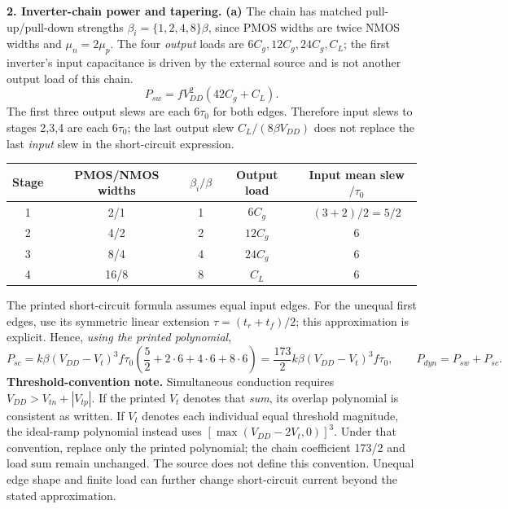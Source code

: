 \documentclass[10pt]{article}
\begin{document}
\newpage\textbf{2. Inverter-chain power and tapering.}
\textbf{(a)} The chain has matched pull-up/pull-down strengths $\beta_i=\{1,2,4,8\}\beta$, since PMOS widths are twice NMOS widths and $\mu_n=2\mu_p$. The four \emph{output} loads are $6C_g,12C_g,24C_g,C_L$; the first inverter's input capacitance is driven by the external source and is not another output load of this chain.
\[\boxed{P_{sw}=fV_{DD}^2(42C_g+C_L).}\]
The first three output slews are each $6\tau_0$ for both edges. Therefore input slews to stages 2,3,4 are each $6\tau_0$; the last output slew $C_L/(8\beta V_{DD})$ does not replace the last \emph{input} slew in the short-circuit expression.
\begin{center}\begin{tabular}{ccccc}\toprule
Stage & PMOS/NMOS widths & $\beta_i/\beta$ & Output load & Input mean slew$/\tau_0$\\\midrule
1&2/1&1&$6C_g$&$(3+2)/2=5/2$\\
2&4/2&2&$12C_g$&6\\
3&8/4&4&$24C_g$&6\\
4&16/8&8&$C_L$&6\\\bottomrule\end{tabular}\end{center}
The printed short-circuit formula assumes equal input edges. For the unequal first edges, use its symmetric linear extension $\tau=(t_r+t_f)/2$; this approximation is explicit. Hence, \emph{using the printed polynomial},
\[
P_{sc}=k\beta(V_{DD}-V_t)^3f\tau_0\left(\frac52+2\cdot6+4\cdot6+8\cdot6\right)
=\boxed{\frac{173}{2}k\beta(V_{DD}-V_t)^3f\tau_0},\qquad P_{dyn}=P_{sw}+P_{sc}.
\]
\textbf{Threshold-convention note.} Simultaneous conduction requires $V_{DD}>V_{tn}+|V_{tp}|$. If the printed $V_t$ denotes that \emph{sum}, its overlap polynomial is consistent as written. If $V_t$ denotes each individual equal threshold magnitude, the ideal-ramp polynomial instead uses $[\max(V_{DD}-2V_t,0)]^3$. Under that convention, replace only the printed polynomial; the chain coefficient 173/2 and load sum remain unchanged. The source does not define this convention. Unequal edge shape and finite load can further change short-circuit current beyond the stated approximation.
\end{document}
